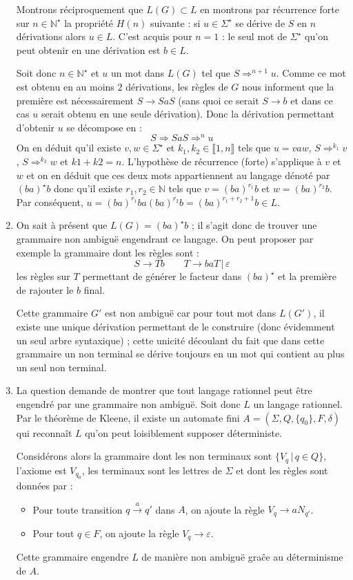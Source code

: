 \documentclass[a4paper, 11pt]{article}
\begin{document}
\begin{enumerate}
  Montrons réciproquement que $L(G) \subset L$ en montrons par récurrence forte sur $n \in \mathbb{N}^{\star}$ la propriété $H(n)$ suivante : si $u \in \Sigma^{\star}$ se dérive de $S$ en $n$ dérivations alors $u \in L$. C'est acquis pour $n = 1$ : le seul mot de $\Sigma^{\star}$ qu'on peut obtenir en une dérivation est $b \in L$.

  Soit donc $n \in \mathbb{N}^{\star}$ et $u$ un mot dans $L(G)$ tel que $S \Rightarrow^{n+1} u$. Comme ce mot est obtenu en au moins $2$ dérivations, les règles de $G$ nous informent que la première est nécessairement $S \rightarrow SaS$ (sans quoi ce serait $S \rightarrow b$ et dans ce cas $u$ serait obtenu en une seule dérivation). Donc la dérivation permettant d'obtenir $u$ se décompose en : \[S \Rightarrow SaS \Rightarrow^n u \] On en déduit qu'il existe $v,w \in \Sigma^{\star}$ et $k_1, k_2 \in \llbracket 1, n \rrbracket$ tels que $u = vaw$, $S \Rightarrow^{k_1} v$, $S \Rightarrow^{k_2} w$ et $k1 + k2 = n$. L'hypothèse de récurrence (forte) s'applique à $v$ et $w$ et on en déduit que ces deux mots appartiennent au langage dénoté par $(ba)^{\star}b$ donc qu'il existe $r_1,r_2 \in \mathbb{N}$ tels que $v = (ba)^{r_1}b$ et $w = (ba)^{r_2}b$. Par conséquent, $u =(ba)^{r_1}ba(ba)^{r_2}b = (ba)^{r_1+r_2+1}b \in L$.

  \item On sait à présent que $L(G) = (ba)^{\star}b$ ; il s'agit donc de trouver une grammaire non ambiguë engendrant ce langage. On peut proposer par exemple la grammaire dont les règles sont : \[S \rightarrow Tb \qquad T \rightarrow baT \, | \, \varepsilon \] les règles sur $T$ permettant de générer le facteur dans $(ba)^{\star}$ et la première de rajouter le $b$ final.
  
  Cette grammaire $G'$ est non ambiguë car pour tout mot dans $L(G')$, il existe une unique dérivation permettant de le construire (donc évidemment un seul arbre syntaxique) ; cette unicité découlant du fait que dans cette grammaire un non terminal se dérive toujours en un mot qui contient au plus un seul non terminal.

  \item La question demande de montrer que tout langage rationnel peut être engendré par une grammaire non ambiguë. Soit donc $L$ un langage rationnel. Par le théorème de Kleene, il existe un automate fini $A = (\Sigma, Q, \{q_0\}, F, \delta)$ qui reconnaît $L$ qu'on peut loisiblement supposer déterministe.
  
  Considérons alors la grammaire dont les non terminaux sont $\{V_q \, | \, q \in Q \}$, l'axiome est $V_{q_0}$, les terminaux sont les lettres de $\Sigma$ et dont les règles sont données par : \begin{itemize}
      \item Pour toute transition $q \overset{a}{\rightarrow} q'$ dans $A$, on ajoute la règle $V_q \rightarrow a N_{q'}$.
      \item Pour tout $q \in F$, on ajoute la règle $V_q \rightarrow \varepsilon$.
  \end{itemize}
  Cette grammaire engendre $L$ de manière non ambiguë graĉe au déterminisme de $A$.

\end{enumerate}
\end{document}
